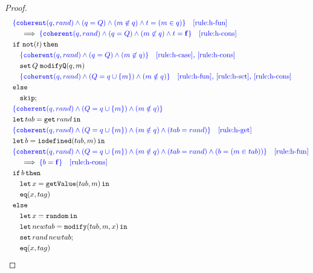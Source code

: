 \begin{proof}
{\begin{align*}
\begin{aligned}
    &\quad \color{blue} \{ \mathtt{coherent}(q, rand) \land (q=Q) \land (m \not\in q) \land t = (m \in q)\} \quad \text{\ref{rule:h-fun}} \\
    &\qquad \implies \color{blue} \{ \mathtt{coherent}(q, rand) \land (q=Q) \land (m \not\in q) \land t = \mathbf{f} \} \quad \text{\ref{rule:h-cons}} \\
    &\quad \mathtt{if}\ \mathtt{not}(t)\,\mathtt{then} \\
    &\qquad \color{blue} \{ \mathtt{coherent}(q, rand) \land (q=Q) \land (m \not\in q) \} \quad \text{\ref{rule:h-case}, \ref{rule:h-cons}} \\
    &\quad\quad \mathtt{set}\,Q\;\mathtt{modifyQ}(q, m) \\
    &\qquad \color{blue} \{ \mathtt{coherent}(q, rand) \land (Q = q \cup \{m\}) \land (m \notin q) \} \quad \text{\ref{rule:h-fun}, \ref{rule:h-set}, \ref{rule:h-cons} } \\
    &\quad \mathtt{else} \\ 
    &\qquad \mathtt{skip}; \\
    &\quad \color{blue} \{ \mathtt{coherent}(q, rand) \land (Q = q \cup \{m\}) \land (m \notin q) \} \quad \text{} \\
    &\quad\mathtt{let}\,tab = \mathtt{get}\,rand\,\mathtt{in}\, \\
    &\quad \color{blue} \{ \mathtt{coherent}(q, rand) \land (Q = q \cup \{m\}) \land (m \notin q) \land (tab=rand) \} \quad \text{\ref{rule:h-get}}\\
    &\quad\mathtt{let}\,b = \mathtt{isdefined}(tab, m)\,\mathtt{in}\, \\
    &\quad \color{blue} \{ \mathtt{coherent}(q, rand) \land (Q = q \cup \{m\}) \land (m \notin q) \land (tab=rand) \land (b=(m \in tab)) \} \quad \text{\ref{rule:h-fun}} \\
    &\qquad \implies \color{blue} \{ b = \mathbf{f} \} \quad \text{\ref{rule:h-cons}} \\
    &\quad\mathtt{if}\, b\, \mathtt{then} \\
    &\quad\quad \mathtt{let}\,x = \mathtt{getValue}(tab, m)\,\mathtt{in}\, \\
    &\quad\quad \mathtt{eq}(x,tag) \\
    &\quad\mathtt{else} \\
    &\quad\quad \mathtt{let}\,x = \mathtt{random}\,\mathtt{in}\, \\
    &\quad\quad \mathtt{let}\,newtab = \mathtt{modify}(tab, m, x)\,\mathtt{in}\, \\
    &\quad\quad \mathtt{set}\,rand\,newtab; \\
    &\quad\quad \mathtt{eq}(x,tag)
\end{aligned}
\end{align*}
}


\end{proof}
